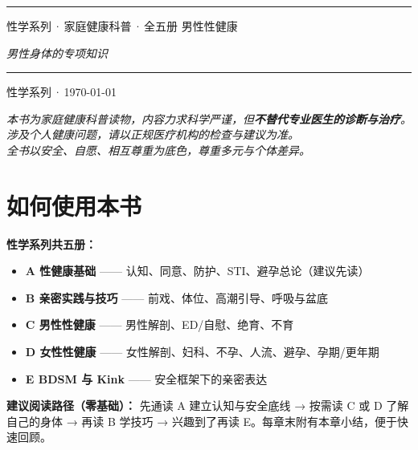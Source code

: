 \documentclass[12pt,UTF8,openany]{ctexbook}
\begin{document}
\begin{titlepage}
\centering
\vspace*{1.5cm}
\vspace{0.6cm}
\noindent\rule{\textwidth}{0.4pt}
\vspace{0.5cm}
\myhei{} 性学系列\,·\,家庭健康科普\,·\,全五册
\vspace{2.5cm}
\myhei{} 男性性健康\par
\vspace{1.2cm}
\itshape{} 男性身体的专项知识\par
\vspace{5.2cm}
\noindent\rule{\textwidth}{0.4pt}
\vspace{0.5cm}
 性学系列\,·\,\today
\end{titlepage}

\begin{center}\itshape
本书为家庭健康科普读物，内容力求科学严谨，但\textbf{不替代专业医生的诊断与治疗}。\\
涉及个人健康问题，请以正规医疗机构的检查与建议为准。\\
全书以安全、自愿、相互尊重为底色，尊重多元与个体差异。\par\end{center}
\clearpage

\chapter*{如何使用本书}
\noindent\textbf{性学系列共五册：}
\begin{itemize}[leftmargin=2em]
\item \textbf{A 性健康基础} —— 认知、同意、防护、STI、避孕总论（建议先读）
\item \textbf{B 亲密实践与技巧} —— 前戏、体位、高潮引导、呼吸与盆底
\item \textbf{C 男性性健康} —— 男性解剖、ED/自慰、绝育、不育
\item \textbf{D 女性性健康} —— 女性解剖、妇科、不孕、人流、避孕、孕期/更年期
\item \textbf{E BDSM 与 Kink} —— 安全框架下的亲密表达
\end{itemize}
\vspace{0.6em}
\noindent\textbf{建议阅读路径（零基础）：} 先通读 A 建立认知与安全底线 → 按需读 C 或 D 了解自己的身体 → 再读 B 学技巧 → 兴趣到了再读 E。每章末附有本章小结，便于快速回顾。
\clearpage
\end{document}
